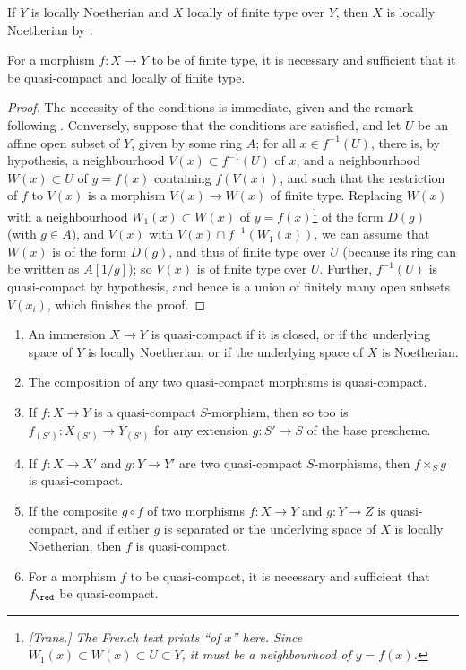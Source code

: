 If $Y$ is locally Noetherian and $X$ locally of finite type over $Y$, then $X$ is locally Noetherian by .

\begin{proposition}[6.6.3]
\label{I.6.6.3}
For a morphism $f: X\to Y$ to be of finite type, it is necessary and sufficient that it be quasi-compact and locally of finite type.
\end{proposition}

\begin{proof}
The necessity of the conditions is immediate, given  and the remark following .
Conversely, suppose that the conditions are satisfied, and let $U$ be an affine open subset of $Y$, given by some ring $A$;
for all $x\in f^{-1}(U)$, there is, by hypothesis, a neighbourhood $V(x)\subset f^{-1}(U)$ of $x$, and a neighbourhood $W(x)\subset U$ of $y=f(x)$ containing $f(V(x))$, and such that the restriction of $f$ to $V(x)$ is a morphism $V(x)\to W(x)$ of finite type.
Replacing $W(x)$ with a neighbourhood $W_1(x)\subset W(x)$ of $y=f(x)$\footnote{\emph{[Trans.] The French text prints ``of $x$'' here. Since $W_1(x)\subset W(x)\subset U\subset Y$, it must be a neighbourhood of $y=f(x)$.}} of the form $D(g)$ (with $g\in A$), and $V(x)$ with $V(x)\cap f^{-1}(W_1(x))$, we can assume that $W(x)$ is of the form $D(g)$, and thus of finite type over $U$ (because its ring can be written as $A[1/g]$);
so $V(x)$ is of finite type over $U$.
Further, $f^{-1}(U)$ is quasi-compact by hypothesis, and hence is a union of finitely many open subsets $V(x_i)$, which finishes the proof.
\end{proof}

\begin{proposition}[6.6.4]
\label{I.6.6.4}
\medskip\noindent
\begin{enumerate}
  \item[{\rm(i)}] An immersion $X\to Y$ is quasi-compact if it is closed, or if the underlying space of $Y$ is locally Noetherian, or if the underlying space of $X$ is Noetherian.
  \item[{\rm(ii)}] The composition of any two quasi-compact morphisms is quasi-compact.
  \item[{\rm(iii)}] If $f: X\to Y$ is a quasi-compact $S$-morphism, then so too is $f_{(S')}: X_{(S')}\to Y_{(S')}$ for any extension $g: S'\to S$ of the base prescheme.
  \item[{\rm(iv)}] If $f:X\to X'$ and $g:Y\to Y'$ are two quasi-compact $S$-morphisms, then $f\times_S g$ is quasi-compact.
  \item[{\rm(v)}] If the composite $g\circ f$ of two morphisms $f: X\to Y$ and $g:Y\to Z$ is quasi-compact, and if either $g$ is separated or the underlying space of $X$ is locally Noetherian, then $f$ is quasi-compact.
  \item[{\rm(vi)}] For a morphism $f$ to be quasi-compact, it is necessary and sufficient that $f_\red$ be quasi-compact.
\end{enumerate}
\end{proposition}

